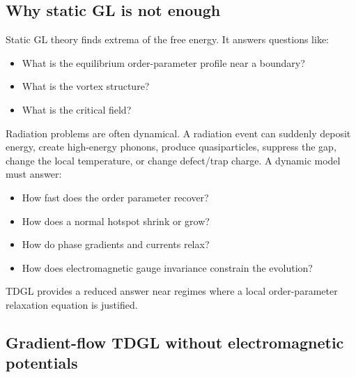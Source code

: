 \documentclass[11pt]{article}
\numberwithin{equation}{section}
\begin{document}
\subsection{Why static GL is not enough}

Static GL theory finds extrema of the free energy. It answers questions like:
\begin{itemize}[leftmargin=2em]
\item What is the equilibrium order-parameter profile near a boundary?
\item What is the vortex structure?
\item What is the critical field?
\end{itemize}
Radiation problems are often dynamical. A radiation event can suddenly deposit energy, create high-energy phonons, produce quasiparticles, suppress the gap, change the local temperature, or change defect/trap charge. A dynamic model must answer:
\begin{itemize}[leftmargin=2em]
\item How fast does the order parameter recover?
\item How does a normal hotspot shrink or grow?
\item How do phase gradients and currents relax?
\item How does electromagnetic gauge invariance constrain the evolution?
\end{itemize}
TDGL provides a reduced answer near regimes where a local order-parameter relaxation equation is justified.

\subsection{Gradient-flow TDGL without electromagnetic potentials}
\end{document}
